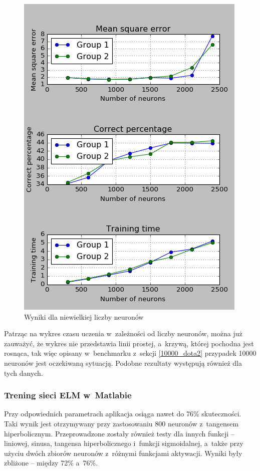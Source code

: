 \documentclass{article}
\begin{document}
\begin{figure}[H]
\centering
\includegraphics[width=\textwidth]{wyniki_forest_python.png}
\caption{Wyniki dla niewielkiej liczby neuronów}
\label{forest_python}
\end{figure}
Patrząc na wykres czasu uczenia w~zależności od liczby neuronów, można już zauważyć, że wykres nie przedstawia linii prostej, a~krzywą, której pochodna jest rosnąca, tak więc opisany w~benchmarku z~sekcji \ref{10000_dota2} przypadek 10000 neuronów jest oczekiwaną sytuacją. Podobne rezultaty występują również dla tych danych.
\subsubsection{Trening sieci ELM w~Matlabie}
Przy odpowiednich parametrach aplikacja osiąga nawet do 76\% skuteczności. 
Taki wynik jest otrzymywany przy zastosowaniu 800 neuronów z~tangensem hiperbolicznym.
Przeprowadzone zostały również testy dla innych funkcji -- liniowej, sinusa, tangensa hiperbolicznego i~funkcji sigmoidalnej, a~także przy użyciu dwóch zbiorów neuronów z~różnymi funkcjami aktywacji.
Wyniki były zbliżone -- między 72\% a~76\%.
\end{document}
